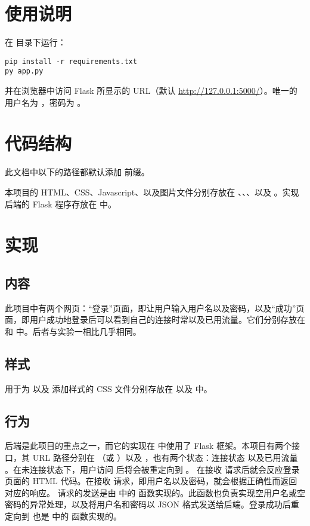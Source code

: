 \section{使用说明}

在  目录下运行：
\begin{lstlisting}
pip install -r requirements.txt
py app.py
\end{lstlisting}
并在浏览器中访问 Flask 所显示的 URL（默认 \url{http://127.0.0.1:5000/}）。唯一的用户名为 ，密码为 。

\section{代码结构}

此文档中以下的路径都默认添加  前缀。

本项目的 HTML、CSS、Javascript、以及图片文件分别存放在 、、、以及 。实现后端的 Flask 程序存放在  中。

\section{实现}

\subsection{内容}

此项目中有两个网页：“登录”页面，即让用户输入用户名以及密码，以及“成功”页面，即用户成功地登录后可以看到自己的连接时常以及已用流量。它们分别存放在  和  中。后者与实验一相比几乎相同。

\subsection{样式}

用于为  以及  添加样式的 CSS 文件分别存放在  以及  中。

\subsection{行为}

后端是此项目的重点之一，而它的实现在  中使用了 Flask 框架。本项目有两个接口，其 URL 路径分别在 （或 \code{/}）以及 ，也有两个状态：连接状态  以及已用流量 。在未连接状态下，用户访问  后将会被重定向到 。 在接收  请求后就会反应登录页面的 HTML 代码。在接收  请求，即用户名以及密码，就会根据正确性而返回对应的响应。 请求的发送是由  中的  函数实现的。此函数也负责实现空用户名或空密码的异常处理，以及将用户名和密码以 JSON 格式发送给后端。登录成功后重定向到  也是  中的  函数实现的。

